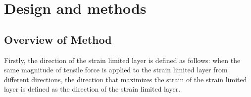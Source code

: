 \documentclass[conference]{IEEEtran}
\begin{document}
\section{Design and methods}

\subsection{Overview of Method}

Firstly, the direction of the strain limited layer is defined as follows: when the same magnitude of tensile force is applied to the strain limited layer from different directions, the direction that maximizes the strain of the strain limited layer is defined as the direction of the strain limited layer.
\end{document}
